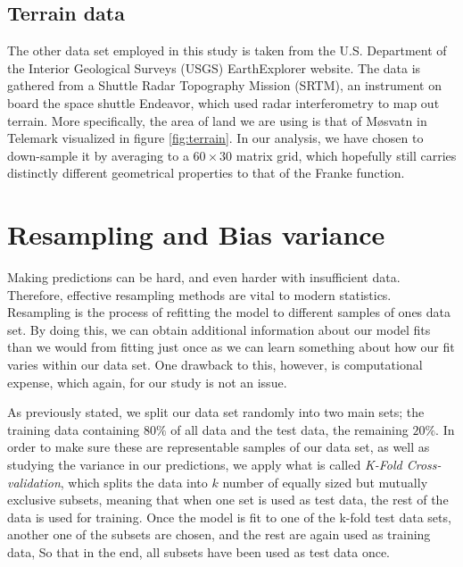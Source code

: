 \documentclass[a4paper, twocolumn]{article}
\begin{document}
\subsection{Terrain data}
The other data set employed in this study is taken from the U.S. Department of the Interior Geological Surveys (USGS) EarthExplorer website. The data is gathered from a Shuttle Radar Topography Mission (SRTM), an instrument on board the space shuttle Endeavor, which used radar interferometry to map out terrain. More specifically, the area of land we are using is that of M\o svatn in Telemark visualized in figure \ref{fig:terrain}. In our analysis, we have chosen to down-sample it by averaging to a $60\times 30$ matrix grid, which hopefully still carries distinctly different geometrical properties to that of the Franke function.

\section{Resampling and Bias variance}
Making predictions can be hard, and even harder with insufficient data. Therefore, effective resampling methods are vital to modern statistics. Resampling is the process of refitting the model to different samples of ones data set. By doing this, we can obtain additional information about our model fits than we would from fitting just once as we can learn something about how our fit varies within our data set. One drawback to this, however, is computational expense, which again, for our study is not an issue.

As previously stated, we split our data set randomly into two main sets; the training data containing $80 \%$ of all data and the test data, the remaining $20\%$. In order to make sure these are representable samples of our data set, as well as studying the variance in our predictions, we apply what is called \textit{K-Fold Cross-validation}, which splits the data into $k$ number of equally sized but mutually exclusive subsets, meaning that when one set is used as test data, the rest of the data is used for training. Once the model is fit to one of the k-fold test data sets, another one of the subsets are chosen, and the rest are again used as training data, So that in the end, all subsets have been used as test data once.
\end{document}
